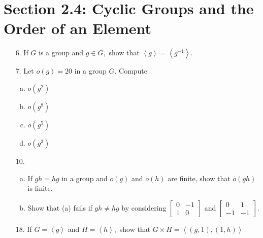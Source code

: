 \documentclass{article}
\begin{document}
\section*{Section 2.4: Cyclic Groups and the Order of an Element}
\begin{itemize}
	\item[6.] If $G$ is a group and $g\in G,$ show that $\left< g\right>=\left< g^{-1}\right>.$

	\item[7.] Let $o(g)=20$ in a group $G.$ Compute
		\begin{enumerate}[(a)]
			\item $o(g^2)$ 

			\item $o(g^8)$ 

			\item $o(g^5)$

			\item $o(g^3)$
				
		\end{enumerate}

	\item[10.] \begin{enumerate}[(a)]
			\item If $gh=hg$ in a group and $o(g)$ and $o(h)$ are finite, show that $o(gh)$ is finite.

			\item Show that (a) fails if $gh\neq hg$ by considering $\begin{bmatrix}
					0 & -1 \\
					1 & 0
				\end{bmatrix}$ and $\begin{bmatrix}
					0 & 1 \\
					-1 & -1
				\end{bmatrix}.$
				
		\end{enumerate}

	\item[18.] If $G=\left< g\right>$ and $H=\left< h\right>,$ show that $G\times H=\left< (g, 1), (1, h)\right>$
		
\end{itemize}
\end{document}
